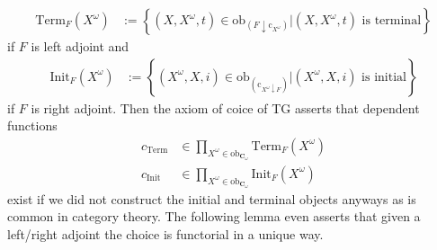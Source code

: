 \begin{align*}
  \mathrm{Term}_{F}(X^{\omega})
  &:=
  \left\lbrace
      (X,X^{\omega},t)
      \in
      \mathrm{ob}_{(F \downarrow \mathrm{c}_{X^{\omega}})}
    \vert
      (X,X^{\omega},t)
      \text{ is terminal}
  \right\rbrace
\end{align*}
if $F$ is left adjoint and
\begin{align*}
  \mathrm{Init}_{F}(X^{\omega})
  &:=
  \left\lbrace
      (X^{\omega},X,i)
      \in
      \mathrm{ob}_{(\mathrm{c}_{X^{\omega} \downarrow F})}
    \vert
      (X^{\omega},X,i)
      \text{ is initial}
  \right\rbrace
\end{align*}
if $F$ is right adjoint. Then the axiom of coice of TG asserts that dependent functions
\begin{align*}
  c_{\mathrm{Term}}
  &\in
  \prod_{X^{\omega} \in \mathrm{ob}_{\mathbf{C}_{\omega}}}
  \mathrm{Term}_{F}(X^{\omega})
  \\
  c_{\mathrm{Init}}
  &\in
  \prod_{X^{\omega} \in \mathrm{ob}_{\mathbf{C}_{\omega}}}
  \mathrm{Init}_{F}(X^{\omega})
\end{align*}
exist if we did not construct the initial and terminal objects anyways as is common in category theory. The following lemma even asserts that given a left/right adjoint the choice is functorial in a unique way.
\\

